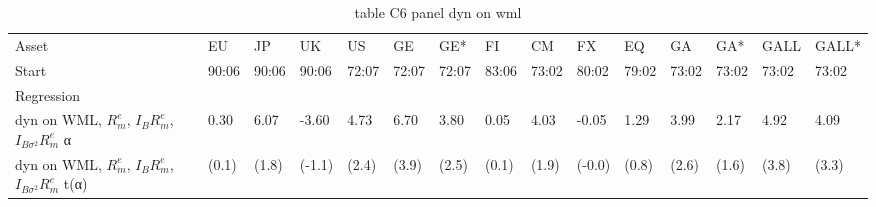 \begin{table}[htbp]
  \centering
  \caption{table C6 panel dyn on wml}
  \label{tab:table_C6_panel_dyn_on_wml}
  \begin{tabular}{lllllllllllllll}
\toprule
Asset & EU & JP & UK & US & GE & GE* & FI & CM & FX & EQ & GA & GA* & GALL & GALL* \\
Start & 90:06 & 90:06 & 90:06 & 72:07 & 72:07 & 72:07 & 83:06 & 73:02 & 80:02 & 79:02 & 73:02 & 73:02 & 73:02 & 73:02 \\
Regression &  &  &  &  &  &  &  &  &  &  &  &  &  &  \\
\midrule
dyn on WML, $R^e_m$, $I_B R^e_m$, $I_{B\sigma^2} R^e_m$ α & 0.30 & 6.07 & -3.60 & 4.73 & 6.70 & 3.80 & 0.05 & 4.03 & -0.05 & 1.29 & 3.99 & 2.17 & 4.92 & 4.09 \\
dyn on WML, $R^e_m$, $I_B R^e_m$, $I_{B\sigma^2} R^e_m$ t(α) & (0.1) & (1.8) & (-1.1) & (2.4) & (3.9) & (2.5) & (0.1) & (1.9) & (-0.0) & (0.8) & (2.6) & (1.6) & (3.8) & (3.3) \\
\bottomrule
\end{tabular}

\end{table}

